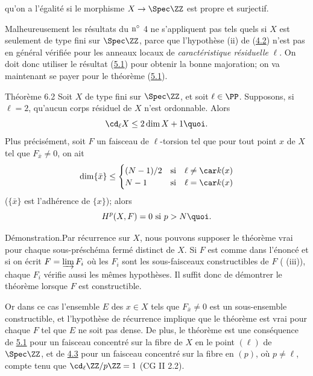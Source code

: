 \documentclass[10pt]{../fichiers-configuration-latex/smfart}
\begin{document}
 qu'on a
l'égalité si le morphisme $X\rightarrow \Spec \ZZ$ est propre
et surjectif.

Malheureusement les résultats du ${\rm n^{\circ}}$ 4 ne s'appliquent
pas tels quels si $X$ est seulement de type fini sur $\Spec
\ZZ$, parce que l'hypothèse (ii) de (\hyperref[X.cor4.2]{4.2}) n'est pas en général
vérifiée pour les anneaux locaux de \emph{caractéristique résiduelle}
$\ell$. On doit donc utiliser le résultat (\hyperref[X.thm5.1]{5.1}) pour obtenir la bonne
majoration; on va maintenant se payer pour le théorème (\hyperref[X.thm5.1]{5.1}).

\begin{enonce*}{Théorème 6.2}
Soit $X$ de type fini sur $\Spec \ZZ$, et soit $\ell\in
\PP$. Supposons, si $\ell=2$, qu'aucun corps résiduel de $X$
n'est ordonnable. Alors
$$
\cd_{\ell}X\leq 2\dim X+1{\quoi}.
$$
Plus précisément, soit $F$ un faisceau de $\ell$-torsion tel que pour
tout point $x$ de $X$ tel que $F_{\bar{x}}\neq 0$, on ait
$$
\dim\{\bar{x}\}\leq
\begin{cases}
(N-1)/2 &\mbox{si\quad } \ell\neq \car k(x)\\
N-1     &\mbox{si\quad } \ell=\car k(x)
\end{cases}
$$
($\{\bar{x}\}$ est l'adhérence de $\{x\}$); alors
$$
H^p(X,F)=0\mbox{ si } p>N{\quoi}.
$$
\end{enonce*}

Démonstration.\pageoriginale Par récurrence sur $X$, nous pouvons supposer le
théorème vrai pour chaque sous-préschéma fermé distinct de $X$. Si $F$
est comme dans l'énoncé et si on écrit $F=\varinjlim F_i$ où les $F_i$
sont les sous-faisceaux constructibles de $F$ ( (iii)), chaque
$F_i$ vérifie aussi les mêmes hypothèses. Il suffit donc de démontrer
le théorème lorsque $F$ est constructible.

Or dans ce cas l'ensemble $E$ des $x\in X$ tels que $F_{\bar{x}}\neq
0$ est un sous-ensemble constructible, et l'hypothèse de récurrence
implique que le théorème est vrai pour chaque $F$ tel que $E$ ne soit
pas dense. De plus, le théorème est une conséquence de \hyperref[X.thm5.1]{5.1} pour un
faisceau concentré sur la fibre de $X$ en le point $(\ell)$ de $\Spec
\ZZ$, et de \hyperref[X.cor4.3]{4.3} pour un faisceau concentré sur la fibre en
$(p)$, où $p\neq \ell$, compte tenu que $\cd_{\ell}\ZZ/p
\ZZ=1$ (CG II 2.2).
\end{document}
